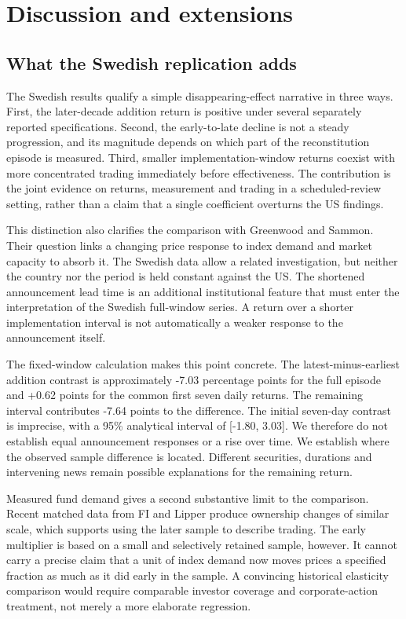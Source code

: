 \section{Discussion and extensions}\label{sec:discussion}
\subsection{What the Swedish replication adds}

The Swedish results qualify a simple disappearing-effect narrative in three ways. First, the later-decade addition return is positive under several separately reported specifications. Second, the early-to-late decline is not a steady progression, and its magnitude depends on which part of the reconstitution episode is measured. Third, smaller implementation-window returns coexist with more concentrated trading immediately before effectiveness. The contribution is the joint evidence on returns, measurement and trading in a scheduled-review setting, rather than a claim that a single coefficient overturns the US findings.

This distinction also clarifies the comparison with Greenwood and Sammon. Their question links a changing price response to index demand and market capacity to absorb it. The Swedish data allow a related investigation, but neither the country nor the period is held constant against the US. The shortened announcement lead time is an additional institutional feature that must enter the interpretation of the Swedish full-window series. A return over a shorter implementation interval is not automatically a weaker response to the announcement itself.

The fixed-window calculation makes this point concrete. The latest-minus-earliest addition contrast is approximately -7.03 percentage points for the full episode and +0.62 points for the common first seven daily returns. The remaining interval contributes -7.64 points to the difference. The initial seven-day contrast is imprecise, with a 95\% analytical interval of [-1.80, 3.03]. We therefore do not establish equal announcement responses or a rise over time. We establish where the observed sample difference is located. Different securities, durations and intervening news remain possible explanations for the remaining return.

Measured fund demand gives a second substantive limit to the comparison. Recent matched data from FI and Lipper produce ownership changes of similar scale, which supports using the later sample to describe trading. The early multiplier is based on a small and selectively retained sample, however. It cannot carry a precise claim that a unit of index demand now moves prices a specified fraction as much as it did early in the sample. A convincing historical elasticity comparison would require comparable investor coverage and corporate-action treatment, not merely a more elaborate regression.

